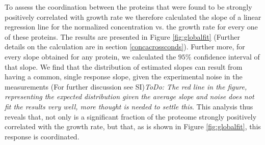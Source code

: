 To assess the coordination between the proteins that were found to be strongly positively correlated with growth rate we therefore calculated the slope of a linear regression line for the normalized concentration vs. the growth rate for every one of these proteins.
The results are presented in Figure \ref{fig:globalfit} (Further details on the calculation are in section \ref{concacrossconds}).
Further more, for every slope obtained for any protein, we calculated the $95\%$ confidence interval of that slope.
We find that the distribution of estimated slopes can result from having a common, single response slope, given the experimental noise in the measurements (For further discussion see SI)\emph{ToDo: The red line in the figure, representing the expected distribution given the average slope and noise does not fit the results very well, more thought is needed to settle this}.
This analysis thus reveals that, not only is a significant fraction of the proteome strongly positively correlated with the growth rate, but that, as is shown in Figure \ref{fig:globalfit}, this response is coordinated.
